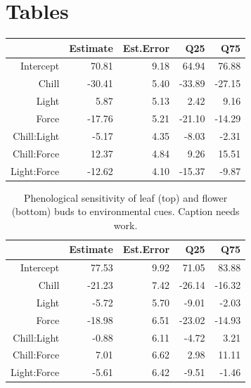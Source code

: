 \documentclass[11pt]{article}\usepackage[]{graphicx}\usepackage[]{color}
\begin{document}
\section*{Tables}
\begin{table}[ht]
\centering
\begin{tabular}{rrrrr}
  \hline
 & Estimate & Est.Error & Q25 & Q75 \\ 
  \hline
Intercept & 70.81 & 9.18 & 64.94 & 76.88 \\ 
  Chill & -30.41 & 5.40 & -33.89 & -27.15 \\ 
  Light & 5.87 & 5.13 & 2.42 & 9.16 \\ 
  Force & -17.76 & 5.21 & -21.10 & -14.29 \\ 
  Chill:Light & -5.17 & 4.35 & -8.03 & -2.31 \\ 
  Chill:Force & 12.37 & 4.84 & 9.26 & 15.51 \\ 
  Light:Force & -12.62 & 4.10 & -15.37 & -9.87 \\ 
   \hline
\end{tabular}
\end{table}
\begin{table}[ht]
\centering
\begin{tabular}{rrrrr}
  \hline
 & Estimate & Est.Error & Q25 & Q75 \\ 
  \hline
Intercept & 77.53 & 9.92 & 71.05 & 83.88 \\ 
  Chill & -21.23 & 7.42 & -26.14 & -16.32 \\ 
  Light & -5.72 & 5.70 & -9.01 & -2.03 \\ 
  Force & -18.98 & 6.51 & -23.02 & -14.93 \\ 
  Chill:Light & -0.88 & 6.11 & -4.72 & 3.21 \\ 
  Chill:Force & 7.01 & 6.62 & 2.98 & 11.11 \\ 
  Light:Force & -5.61 & 6.42 & -9.51 & -1.46 \\ 
   \hline
\end{tabular}
\caption{Phenological sensitivity of leaf (top) and flower (bottom) buds to environmental cues. Caption needs work.} 
\label{tab:modelests}
\end{table}
\end{document}
